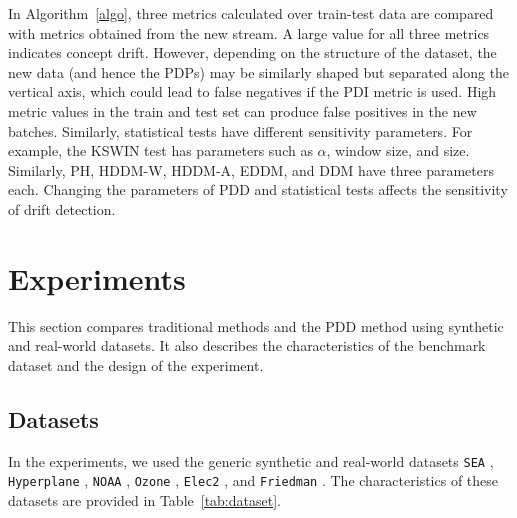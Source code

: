 \documentclass[pdflatex,sn-mathphys-ay]{sn-jnl}%
\theoremstyle{thmstyleone}%
\theoremstyle{thmstyletwo}%
\theoremstyle{thmstylethree}%
\begin{document}
In Algorithm~\ref{algo}, three metrics calculated over train-test data are compared with metrics obtained from the new stream. A large value for all three metrics indicates concept drift. However, depending on the structure of the dataset, the new data (and hence the PDPs) may be similarly shaped but separated along the vertical axis, which could lead to false negatives if the PDI metric is used. High metric values in the train and test set can produce false positives in the new batches. Similarly, statistical tests have different sensitivity parameters. For example, the KSWIN test has parameters such as \(\alpha\), window size, and size. Similarly, PH, HDDM-W, HDDM-A, EDDM, and DDM have three parameters each. Changing the parameters of PDD and statistical tests affects the sensitivity of drift detection. 

\section{Experiments} 

This section compares traditional methods and the PDD method using synthetic and real-world datasets. It also describes the characteristics of the benchmark dataset and the design of the experiment.

\subsection{Datasets}

In the experiments, we used the generic synthetic and real-world datasets \texttt{SEA} \citep{street_and_kim_2001}, \texttt{Hyperplane} \citep{hulten_et_al_2001}, \texttt{NOAA} \citep{elwell_polikar_2011}, \texttt{Ozone} \citep{zhang_and_fan_2008}, \texttt{Elec2} \citep{harries_1999}, and \texttt{Friedman} \citep{ikonomovska_et_al_2011}. The characteristics of these datasets are provided in Table~\ref{tab:dataset}.
\end{document}
